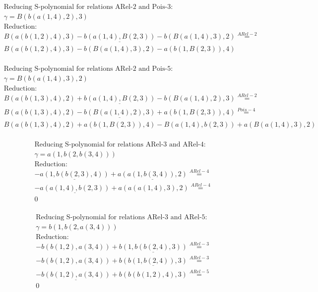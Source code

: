 \documentclass[11pt]{amsart}
\begin{document}
\begin{align*} 
& \text{Reducing S-polynomial for relations ARel-2 and Pois-3:} \\ 
& \gamma = B(b(a(1,4),2),3) \\ 
& \text{Reduction}: \\&B(a(b(1,2),4),3) - \underline{b(a(1,4),B(2,3))} - b(B(a(1,4),3),2) \stackrel{ ARel-2 }{=}  \\ 
&B(a(b(1,2),4),3) - b(B(a(1,4),3),2) - a(b(1,B(2,3)),4)\\ 
\end{align*} 
 
\begin{align*} 
& \text{Reducing S-polynomial for relations ARel-2 and Pois-5:} \\ 
& \gamma = B(b(a(1,4),3),2) \\ 
& \text{Reduction}: \\&B(a(b(1,3),4),2) + \underline{b(a(1,4),B(2,3))} - b(B(a(1,4),2),3) \stackrel{ ARel-2 }{=}  \\ 
&B(a(b(1,3),4),2) - \underline{b(B(a(1,4),2),3)} + a(b(1,B(2,3)),4) \stackrel{ Pois-4 }{=}  \\ 
&B(a(b(1,3),4),2) + a(b(1,B(2,3)),4) - B(a(1,4),b(2,3)) + a(B(a(1,4),3),2)\\ 
\end{align*} 
 
\begin{align*} 
& \text{Reducing S-polynomial for relations ARel-3 and ARel-4:} \\ 
& \gamma = a(1,b(2,b(3,4))) \\ 
& \text{Reduction}: \\& - \underline{a(1,b(b(2,3),4))} + \underline{a(a(1,b(3,4)),2)} \stackrel{ ARel-4 }{=}  \\ 
& - \underline{a(a(1,4),b(2,3))} + a(a(a(1,4),3),2) \stackrel{ ARel-4 }{=}  \\ 
&0\\ 
\end{align*} 
 
\begin{align*} 
& \text{Reducing S-polynomial for relations ARel-3 and ARel-5:} \\ 
& \gamma = b(1,b(2,a(3,4))) \\ 
& \text{Reduction}: \\& - b(b(1,2),a(3,4)) + \underline{b(1,b(b(2,4),3))} \stackrel{ ARel-3 }{=}  \\ 
& - b(b(1,2),a(3,4)) + \underline{b(b(1,b(2,4)),3)} \stackrel{ ARel-3 }{=}  \\ 
& - \underline{b(b(1,2),a(3,4))} + b(b(b(1,2),4),3) \stackrel{ ARel-5 }{=}  \\ 
&0\\ 
\end{align*} 
 
\end{document}
